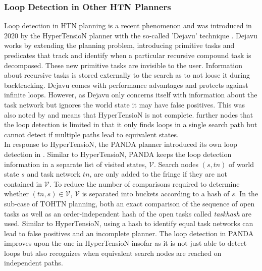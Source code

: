 \subsubsection{Loop Detection in Other HTN Planners}
\label{ld - history others}
Loop detection in HTN planning is a recent phenomenon and was introduced in 2020 by the HyperTensioN planner with the so-called 'Dejavu' technique \cite{magnaguagno2020hypertension}. Dejavu works by extending the planning problem, introducing primitive tasks and predicates that track and identify when a particular recursive compound task is decomposed. These new primitive tasks are invisible to the user. Information about recursive tasks is stored externally to the search as to not loose it during backtracking. Dejavu comes with performance advantages and protects against infinite loops. However, as Dejavu only concerns itself with information about the task network but ignores the world state it may have false positives. This was also noted by \cite{holler2021loop} and means that HyperTensioN is not complete. \cite{holler2021loop} further nodes that the loop detection is limited in that it only finds loops in a single search path but cannot detect if multiple paths lead to equivalent states. \\
In response to HyperTensioN, the PANDA planner introduced its own loop detection in \cite{holler2021loop}. Similar to HyperTensioN, PANDA keeps the loop detection information in a separate list of visited states, $\mathcal{V}$. Search nodes $(s, tn)$ of world state $s$ and task network $tn$, are only added to the fringe if they are not contained in $\mathcal{V}$. To reduce the number of comparisons required to determine whether $(tn, s) \in \mathcal{V}$, $\mathcal{V}$ is separated into buckets according to a hash of $s$. In the sub-case of TOHTN planning, both an exact comparison of the sequence of open tasks as well as an order-independent hash of the open tasks called \textit{taskhash} are used. Similar to HyperTensioN, using a hash to identify equal task networks can lead to false positives and an incomplete planner.
The loop detection in PANDA improves upon the one in HyperTensioN insofar as it is not just able to detect loops but also recognizes when equivalent search nodes are reached on independent paths.
